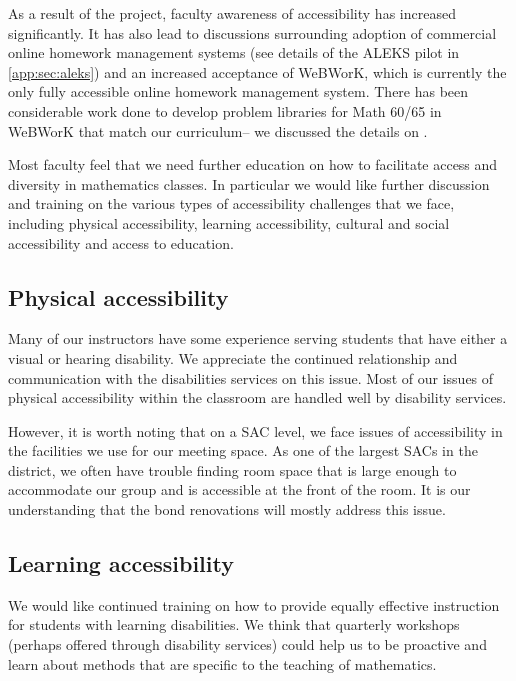 As a result of the project, faculty awareness of accessibility has increased
significantly. It has also lead to discussions surrounding adoption of
commercial online homework management systems (see details of the ALEKS pilot
in \vref{app:sec:aleks}) and an increased acceptance of WeBWorK, which is currently 
the only fully accessible online homework
management system. There has been considerable work done to develop problem
libraries for Math 60/65 in WeBWorK that match our curriculum-- we discussed 
the details on .

Most faculty feel that we need further education on how to facilitate access
and diversity in mathematics classes. In particular we would like further
discussion and training on the various types of accessibility challenges that
we face, including physical accessibility, learning accessibility, cultural and
social accessibility and access to education.

\subsection{Physical accessibility}
Many of our instructors have some experience serving students that have either
a visual or hearing disability. We appreciate the continued relationship and
communication with the disabilities services on this issue. Most of our issues
of physical accessibility within the classroom are handled well by disability
services. 

However, it is worth noting that on a SAC level, we face issues of
accessibility in the facilities we use for our meeting space. As one of the
largest SACs in the district, we often have trouble finding room space that is
large enough to accommodate our group and is accessible at the front of the
room. It is our understanding that the bond renovations will mostly address
this issue.

\subsection{Learning accessibility}
We would like continued training on how to provide equally effective
instruction for students with learning disabilities. We think that quarterly
workshops (perhaps offered through disability services) could help us to be
proactive and learn about methods that are specific to the teaching of
mathematics.

